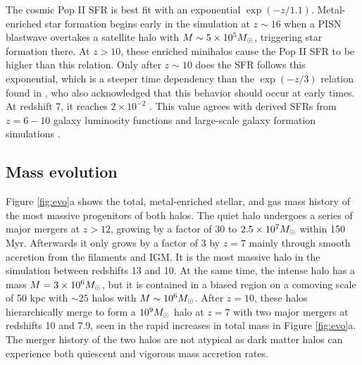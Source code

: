 \documentclass[apjl]{emulateapj}
\begin{document}
The cosmic Pop II SFR is best fit with an exponential $\exp(-z/1.1)$.
Metal-enriched star formation begins early in the simulation at $z
\sim 16$ when a PISN blastwave overtakes a satellite halo with $M \sim
5 \times 10^5 \Ms$, triggering star formation there.  At $z>10$, these
enriched minihalos cause the Pop II SFR to be higher than this
relation.  Only after $z \sim 10$ does the SFR follows this
exponential, which is a steeper time dependency than the $\exp(-z/3)$
relation found in \citet{Hernquist03}, who also acknowledged that this
behavior should occur at early times.  At redshift 7, it reaches $2
\times 10^{-2}$ \sfr.  This value agrees with derived SFRs from
$z=6-10$ galaxy luminosity functions \citep[e.g.][]{Bouwens10} and
large-scale galaxy formation simulations \citep[e.g.][]{Schaye10}.

\subsection{Mass evolution}
\label{sec:halo}



\begin{figure*}
\caption{\label{fig:evo} (a) Evolution of the total halo mass (top),
  stellar mass (middle), and gas fraction (bottom) of the quiet
  (dashed) and intense (solid) halos.  In the top panel, the filtering
  halo mass is plotted as the thick black line (overlapping with the
  quiet halo after $z=9$.  (b) Mass-weighted stellar metallicities and
  gas metallicities enriched by Pop II and Pop III SNe of the intense
  (top) and quiet (bottom) halos.}
\end{figure*}


Figure \ref{fig:evo}a shows the total, metal-enriched stellar, and gas
mass history of the most massive progenitors of both halos.  The quiet
halo undergoes a series of major mergers at $z > 12$, growing by a
factor of 30 to $2.5 \times 10^7 \Ms$ within 150 Myr.  Afterwards it
only grows by a factor of 3 by $z=7$ mainly through smooth accretion
from the filaments and IGM.  It is the most massive halo in the
simulation between redshifts 13 and 10.  At the same time, the intense
halo has a mass $M = 3 \times 10^6 \Ms$, but it is contained in a
biased region on a comoving scale of 50 kpc with $\sim25$ halos with
$M \sim 10^6 \Ms$.  After $z=10$, these halos hierarchically merge to
form a $10^9 \Ms$ halo at $z=7$ with two major mergers at redshifts 10
and 7.9, seen in the rapid increases in total mass in Figure
\ref{fig:evo}a.  The merger history of the two halos are not atypical
as dark matter halos can experience both quiescent and vigorous mass
accretion rates.
\end{document}
